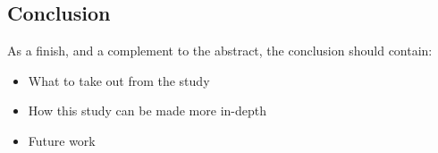 \documentclass[runningheads,a4paper,oribibl]{llncs}
\begin{document}
\subsection{Conclusion}
As a finish, and a complement to the abstract, the conclusion should contain:
\begin{itemize}
	\item What to take out from the study
	\item How this study can be made more in-depth
	\item Future work
\end{itemize}





\nocite{*}

% 


\end{document}
